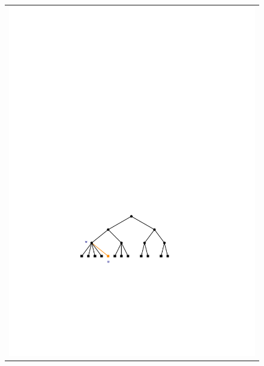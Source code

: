 \begin{figure}
\begin{center}
\begin{tabular}{c}
			\includegraphics[scale=0.90909]{figs/24tree-add-2} \\

\end{tabular}
\end{center}
\end{figure}
